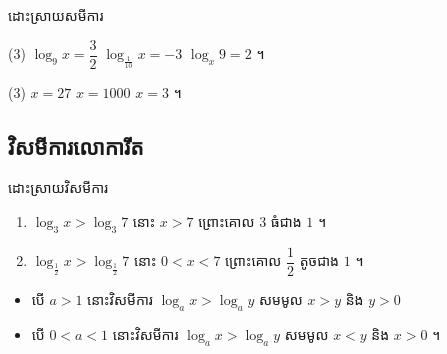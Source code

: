 \begin{pro}
ដោះស្រាយសមីការ
\begin{tasks}(3)
  \task $\log_9 x = \dfrac{3}{2}$
  \task $\log_{\frac{1}{10}} x = -3$
  \task $\log_x 9 = 2$ ។
\end{tasks}
\ans
\begin{tasks}(3)
  \task $x = 27$
  \task $x = 1000$
  \task $x = 3$ ។
\end{tasks}
\end{pro}

\subsection{វិសមីការលោការីត}

\begin{example}[ឧទាហរណ៍]
ដោះស្រាយវិសមីការ
\begin{enumerate}[a]
  \item $\log_3 x > \log_3 7$ នោះ $x > 7$ ព្រោះគោល $3$ ធំជាង $1$ ។
  \item $\log_{\frac{1}{2}} x > \log_{\frac{1}{2}} 7$ នោះ $0 < x < 7$ ព្រោះគោល $\dfrac{1}{2}$ តូចជាង $1$ ។
\end{enumerate}
\end{example}

\begin{formulaBox}[ជាទូទៅ]
\begin{itemize}
  \item បើ $a > 1$ នោះវិសមីការ $\log_a x > \log_a y$ សមមូល $x > y$ និង $y > 0$
  \item បើ $0 < a < 1$ នោះវិសមីការ $\log_a x > \log_a y$ សមមូល $x < y$ និង $x > 0$ ។
\end{itemize}
\end{formulaBox}

